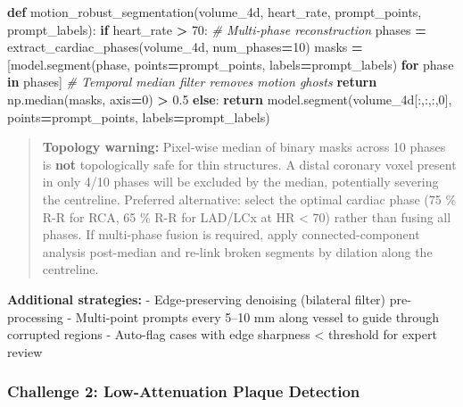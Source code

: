 \documentclass[
  11pt,
]{article}
\newenvironment{Shaded}{\begin{snugshade}}{\end{snugshade}}
\newcommand{\CommentTok}[1]{\textcolor[rgb]{0.56,0.35,0.01}{\textit{#1}}}
\newcommand{\ControlFlowTok}[1]{\textcolor[rgb]{0.13,0.29,0.53}{\textbf{#1}}}
\newcommand{\DecValTok}[1]{\textcolor[rgb]{0.00,0.00,0.81}{#1}}
\newcommand{\FloatTok}[1]{\textcolor[rgb]{0.00,0.00,0.81}{#1}}
\newcommand{\KeywordTok}[1]{\textcolor[rgb]{0.13,0.29,0.53}{\textbf{#1}}}
\newcommand{\NormalTok}[1]{#1}
\newcommand{\OperatorTok}[1]{\textcolor[rgb]{0.81,0.36,0.00}{\textbf{#1}}}
\begin{document}
\begin{Shaded}
\begin{Highlighting}[]
\KeywordTok{def}\NormalTok{ motion\_robust\_segmentation(volume\_4d, heart\_rate, prompt\_points, prompt\_labels):}
    \ControlFlowTok{if}\NormalTok{ heart\_rate }\OperatorTok{\textgreater{}} \DecValTok{70}\NormalTok{:}
        \CommentTok{\# Multi{-}phase reconstruction}
\NormalTok{        phases }\OperatorTok{=}\NormalTok{ extract\_cardiac\_phases(volume\_4d, num\_phases}\OperatorTok{=}\DecValTok{10}\NormalTok{)}
\NormalTok{        masks }\OperatorTok{=}\NormalTok{ [model.segment(phase, points}\OperatorTok{=}\NormalTok{prompt\_points, labels}\OperatorTok{=}\NormalTok{prompt\_labels) }\ControlFlowTok{for}\NormalTok{ phase }\KeywordTok{in}\NormalTok{ phases]}
        \CommentTok{\# Temporal median filter removes motion ghosts}
        \ControlFlowTok{return}\NormalTok{ np.median(masks, axis}\OperatorTok{=}\DecValTok{0}\NormalTok{) }\OperatorTok{\textgreater{}} \FloatTok{0.5}
    \ControlFlowTok{else}\NormalTok{:}
        \ControlFlowTok{return}\NormalTok{ model.segment(volume\_4d[:,:,:,}\DecValTok{0}\NormalTok{], points}\OperatorTok{=}\NormalTok{prompt\_points, labels}\OperatorTok{=}\NormalTok{prompt\_labels)}
\end{Highlighting}
\end{Shaded}

\begin{quote}
\textbf{Topology warning:} Pixel-wise median of binary masks across 10
phases is \textbf{not} topologically safe for thin structures. A distal
coronary voxel present in only 4/10 phases will be excluded by the
median, potentially severing the centreline. Preferred alternative:
select the optimal cardiac phase (75 \% R-R for RCA, 65 \% R-R for
LAD/LCx at HR \textless{} 70) rather than fusing all phases. If
multi-phase fusion is required, apply connected-component analysis
post-median and re-link broken segments by dilation along the
centreline.
\end{quote}

\textbf{Additional strategies:} - Edge-preserving denoising (bilateral
filter) pre-processing - Multi-point prompts every 5--10 mm along vessel
to guide through corrupted regions - Auto-flag cases with edge sharpness
\textless{} threshold for expert review

\subsubsection{Challenge 2: Low-Attenuation Plaque
Detection}\label{challenge-2-low-attenuation-plaque-detection}
\end{document}
